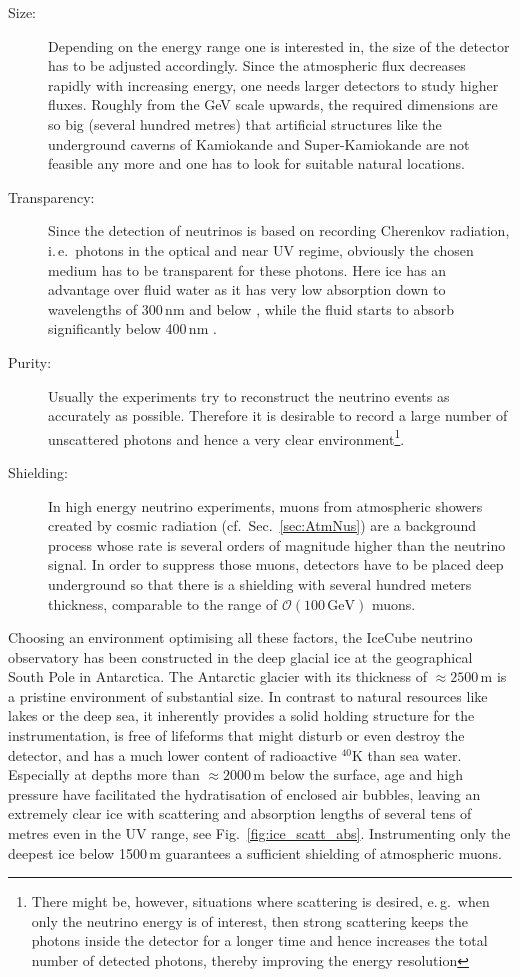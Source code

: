 \begin{description}
 \item[Size:] Depending on the energy range one is interested in, the size of
  the detector has to be adjusted accordingly. Since the atmospheric flux
  decreases rapidly with increasing energy, one needs larger detectors to study
  higher fluxes. Roughly from the GeV scale upwards, the required dimensions are
  so big (several hundred metres) that artificial structures like the
  underground caverns of Kamiokande and Super-Kamiokande \cite{SuperKosc} are
  not feasible any more and one has to look for suitable natural locations.
 \item[Transparency:] Since the detection of neutrinos is based on recording
  Cherenkov radiation, i.\,e.\ photons in the optical and near UV regime,
  obviously the chosen medium has to be transparent for these photons. Here ice
  has an advantage over fluid water as it has very low absorption down to
  wavelengths of 300\,nm and below \cite{IceProps}, while the fluid starts to
  absorb significantly below 400\,nm \cite{WaterAbs}.
 \item[Purity:] Usually the experiments try to reconstruct the neutrino events
  as accurately as possible. Therefore it is desirable to record a large number
  of unscattered photons and hence a very clear environment\footnote{There might
  be, however, situations where scattering is desired, e.\,g.\ when only the
  neutrino energy is of interest, then strong scattering keeps the photons
  inside the detector for a longer time and hence increases the total number
  of detected photons, thereby improving the energy resolution}.
 \item[Shielding:] In high energy neutrino experiments, muons from atmospheric
  showers created by cosmic radiation (cf.\ Sec.~\ref{sec:AtmNus}) are a
  background process whose rate is several orders of magnitude higher than the
  neutrino signal. In order to suppress those muons, detectors have to be
  placed deep underground so that there is a shielding with several hundred
  meters thickness, comparable to the range of $\mathcal{O}
  (100\,\mathrm{GeV})$ muons.
\end{description}

Choosing an environment optimising all these factors, the IceCube neutrino 
observatory has been constructed in the deep glacial ice at the geographical 
South Pole in Antarctica. The Antarctic glacier with its thickness of $\approx 
2500$\,m is a pristine environment of substantial size. In contrast to natural 
resources like lakes or the deep sea, it inherently provides a solid holding 
structure for the instrumentation, is free of lifeforms that might disturb or 
even destroy the detector, and has a much lower content of radioactive $^{40}$K 
than sea water. Especially at depths more than $\approx 2000$\,m below the 
surface, age and high pressure have facilitated the hydratisation of enclosed 
air bubbles, leaving an extremely clear ice with scattering and absorption 
lengths of several tens of metres even in the UV range, see 
Fig.~\ref{fig:ice_scatt_abs}. Instrumenting only the deepest ice below 1500\,m 
guarantees a sufficient shielding of atmospheric muons. 

